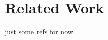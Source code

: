 \section{Related Work}
just some refs for now.
\cite{dakka2008automatic}
\cite{wanner2009visual}
\cite{grobelnik2004visualization}
\cite{collins2006wordnet}
\cite{collins2009docuburst}
\cite{wermter2002selforganizing}
\cite{johnson2004network}
\cite{hearst1995tilebars}
\cite{mehler2006spatial}
\cite{paulovich2006text}

